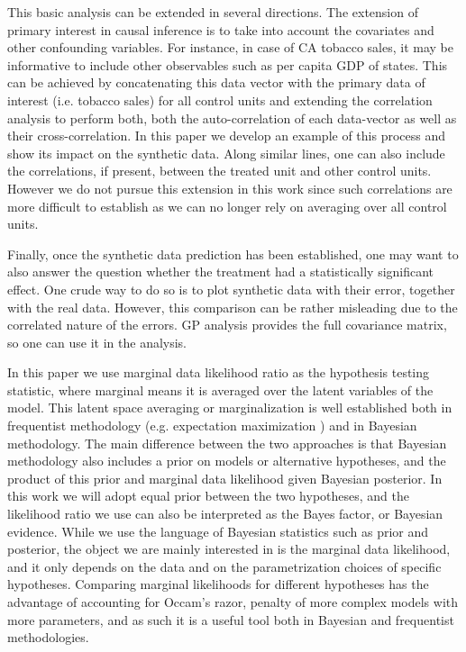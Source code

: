 \documentclass{article}
\begin{document}
This basic analysis can be extended in several directions. The extension of primary interest in causal inference
is to take into account the covariates and other confounding variables. For instance, in case of CA tobacco sales, 
it may be informative to include other observables such as per capita GDP of states. 
This can be achieved by concatenating this data vector with the primary data of interest (i.e. tobacco sales)
for all control units and extending the correlation analysis to perform both, 
both the auto-correlation of each data-vector as well as their cross-correlation.
In this paper we develop an example of this process and show its impact on the synthetic data. 
Along similar lines, one can also include the correlations, if present, between the treated unit and other control units.
However we do not pursue this extension in this work since such correlations are more difficult to establish as  
we can no longer rely on averaging over all control units. 

Finally, once the synthetic data prediction has been 
established, one may want to also answer the question whether the
treatment had a statistically significant effect. One 
crude way to do so is to plot synthetic data with their 
error, together with the real data. However, this comparison 
can be rather misleading due to the correlated nature of 
the errors. GP analysis provides the full covariance matrix, 
so one can use it in the analysis. 


In this paper we use marginal data likelihood ratio as the hypothesis testing 
statistic, where marginal means it is averaged over the latent variables of the model.
This latent space averaging or marginalization is well established both in frequentist methodology (e.g. expectation
maximization \cite{emalgorithm}) and in Bayesian methodology.  
The main difference between the two approaches is that Bayesian methodology also includes a prior on models or alternative hypotheses, 
and the product of this prior and marginal data likelihood given Bayesian posterior. In this work we will 
adopt equal prior between the two hypotheses, and the likelihood ratio  we use can also be interpreted 
as the Bayes factor, or Bayesian evidence. While we use the language of Bayesian statistics
such as prior and posterior, the object we are mainly interested in is the marginal data 
likelihood, and it only depends on the data and on the parametrization choices of specific hypotheses. 
Comparing marginal likelihoods for different hypotheses has the advantage of accounting for Occam's razor, penalty 
of more complex models with more parameters, and as such it is a useful tool both in Bayesian and frequentist 
methodologies.
\end{document}
